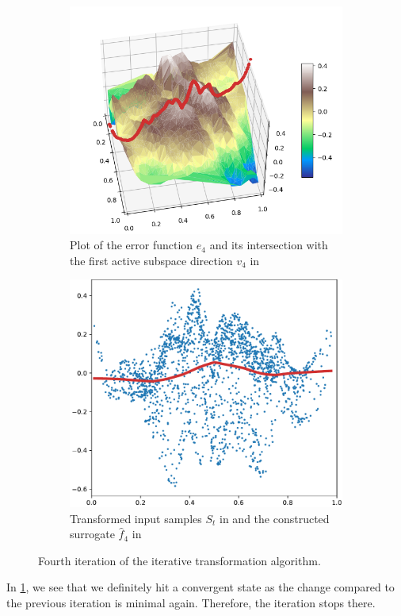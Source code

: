 \documentclass[
  a4paper,  %
  twoside,  %
  bibliography=totoc,
  headsepline,
  cleardoublepage=empty,
  parskip=half,
  draft=false
]{scrbook}
\begin{document}
\begin{mdframed}[style=style]
\begin{figure}[H]
\begin{subfigure}{.5\textwidth}
  \centering
  \includegraphics[width=.85\linewidth]{graphics/pipeline_current_4.png}
  \caption{Plot of the error function $e_4$ and its intersection with the first active subspace direction $v_4$ in \reddot}
\end{subfigure}%
\begin{subfigure}{.5\textwidth}
  \centering
  \includegraphics[width=.85\linewidth]{graphics/pipeline_local_4}
  \caption{Transformed input samples $S_t$ in \darkblue and the constructed surrogate $\hat{f}_4$ in \reddot}
\end{subfigure}
\delimit
\caption{Fourth iteration of the iterative transformation algorithm.}
\label{fig:pipeline_4}
\end{figure}
\end{mdframed}
%
In \cref{fig:pipeline_4}, we see that we definitely hit a convergent state as the change compared to the previous iteration is minimal again.
Therefore, the iteration stops there.
\end{document}
